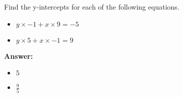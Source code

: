  Find the y-intercepts for each of the following equations. \begin{itemize}\item \( y \times -1 + x \times 9 = -5 \)\item \( y \times 5 + x \times -1 = 9 \)\end{itemize}

        \textbf{Answer:} \begin{itemize}\item \( 5 \)\item \( \frac{9}{5} \)\end{itemize}
